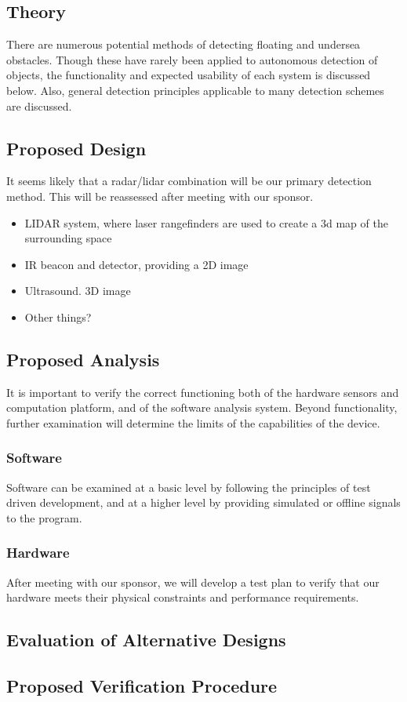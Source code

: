 \subsection{\label{sec:method:theory}Theory}
There are numerous potential methods of detecting floating and undersea obstacles. Though these have rarely been applied to autonomous detection of objects, the functionality and expected usability of each system is discussed below. Also, general detection principles applicable to many detection schemes are discussed.


\subsection{\label{sec:method:proposed-design}Proposed Design}
It seems likely that a radar/lidar combination will be our primary detection method.  This will be reassessed after meeting with our sponsor.


\begin{itemize}
\item LIDAR system, where laser rangefinders are used to create a 3d map of the surrounding space
\item IR beacon and detector, providing a 2D image
\item Ultrasound. 3D image
\item Other things?
\end{itemize}



\subsection{\label{sec:method:proposed-analysis}Proposed Analysis}
It is important to verify the correct functioning both of the hardware sensors and computation platform, and of the software analysis system. Beyond functionality, further examination will determine the limits of the capabilities of the device.
\subsubsection{\label{sec:method:proposed-analysis:software}Software}
Software can be examined at a basic level by following the principles of test driven development, and at a higher level by providing simulated or offline signals to the program.

\subsubsection{\label{sec:method:proposed-analysis:hardware}Hardware}
After meeting with our sponsor, we will develop a test plan to verify that our hardware meets their physical constraints and performance requirements.

\subsection{\label{sec:method:evaluation-of-alternative-designs}Evaluation of Alternative Designs}

\subsection{\label{sec:method:proposed-verification-procedure}Proposed Verification Procedure}
